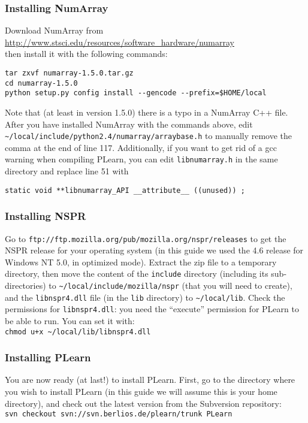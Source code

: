 \documentclass[11pt]{book}
\begin{document}
\subsubsection{Installing NumArray}

Download NumArray from \\
\url{http://www.stsci.edu/resources/software_hardware/numarray} \\
then install it with the following commands:
\begin{verbatim}
tar zxvf numarray-1.5.0.tar.gz
cd numarray-1.5.0
python setup.py config install --gencode --prefix=$HOME/local
\end{verbatim}

Note that (at least in version 1.5.0) there is a typo in a NumArray C++ file.
After you have installed NumArray with the commands above, edit
\verb!~/local/include/python2.4/numarray/arraybase.h! to manually remove the comma
at the end of line 117. Additionally, if you want to get rid of a gcc warning
when compiling PLearn, you can edit \verb!libnumarray.h!
in the same directory and replace line 51 with
\begin{verbatim}
static void **libnumarray_API __attribute__ ((unused)) ;
\end{verbatim}

\subsubsection{Installing NSPR}

Go to \verb!ftp://ftp.mozilla.org/pub/mozilla.org/nspr/releases! to get
the NSPR release for your operating system (in this guide we used the
4.6 release for Windows NT 5.0, in optimized mode).
Extract the zip file to a temporary directory, then move the content of the
\verb!include! directory (including its sub-directories) to \verb!~/local/include/mozilla/nspr! (that you
will need to create), and the
\verb!libnspr4.dll! file (in the \verb!lib! directory) to \verb!~/local/lib!.
Check the permissions for \verb!libnspr4.dll!: you need the ``execute'' permission
for PLearn to be able to run. You can set it with:\\
\verb!chmod u+x ~/local/lib/libnspr4.dll!

\subsubsection{Installing PLearn}

You are now ready (at last!) to install PLearn. First, go to the directory
where you wish to install PLearn (in this guide we will assume this is your
home directory), and check out the latest
version from the Subversion repository:\\
\verb!svn checkout svn://svn.berlios.de/plearn/trunk PLearn!
\end{document}
